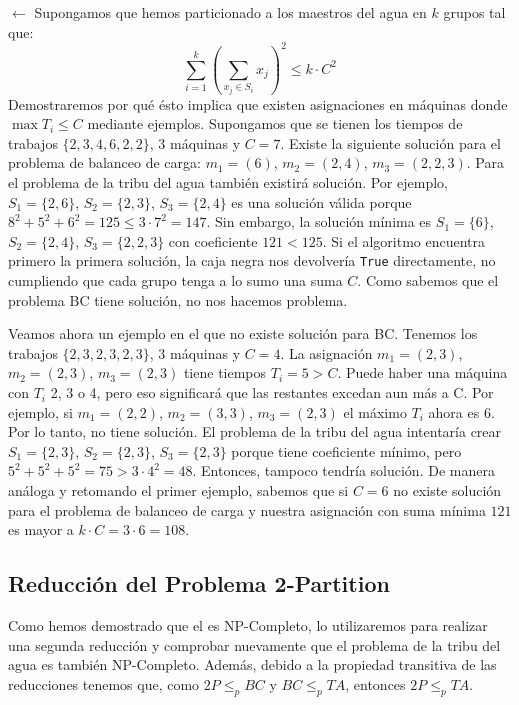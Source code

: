\documentclass{article}
\begin{document}
$\leftarrow$ Supongamos que hemos particionado a los maestros del agua en \( k \) grupos tal que:
\[
\sum_{i=1}^{k} \left( \sum_{x_j \in S_i} x_j \right)^2 \leq k \cdot C^2
\]
Demostraremos por qué ésto implica que existen asignaciones en máquinas donde $\max T_i \leq C$ mediante ejemplos. Supongamos que se tienen los tiempos de trabajos $\{2, 3, 4, 6, 2, 2\}$, 3 máquinas y $C = 7$. Existe la siguiente solución para el problema de balanceo de carga: $m_1 = (6)$, $m_2 = (2, 4)$, $m_3 = (2, 2, 3)$. Para el problema de la tribu del agua también existirá solución. Por ejemplo, $S_1 = \{2, 6\}$, $S_2 = \{2, 3\}$, $S_3 = \{2, 4\}$ es una solución válida porque $8^2 + 5^2 + 6^2 = 125 \leq 3 \cdot 7^2 = 147$. Sin embargo, la solución mínima es $S_1 = \{6\}$, $S_2 = \{2, 4\}$, $S_3 = \{2, 2, 3\}$ con coeficiente $121 < 125$.  Si el algoritmo encuentra primero la primera solución, la caja negra nos devolvería \texttt{True} directamente, no cumpliendo que cada grupo tenga a lo sumo una suma $C$. Como sabemos que el problema BC tiene solución, no nos hacemos problema. 

Veamos ahora un ejemplo en el que no existe solución para BC. Tenemos los trabajos $\{2, 3, 2, 3, 2, 3\}$, 3 máquinas y $C = 4$. La asignación $m_1 = (2, 3)$, $m_2 = (2, 3)$, $m_3 = (2, 3)$ tiene tiempos $T_i = 5 > C$. Puede haber una máquina con $T_i$ 2, 3 o 4, pero eso significará que las restantes excedan aun más a C. Por ejemplo, si $m_1 = (2, 2)$, $m_2 = (3, 3)$, $m_3 = (2, 3)$ el máximo $T_i$ ahora es 6. Por lo tanto, no tiene solución. El problema de la tribu del agua intentaría crear $S_1 = \{2, 3\}$, $S_2 = \{2, 3\}$, $S_3 = \{2, 3\}$ porque tiene coeficiente mínimo, pero $5^2 + 5^2 + 5^2 = 75 > 3 \cdot 4^2 = 48$. Entonces, tampoco tendría solución. De manera análoga y retomando el primer ejemplo, sabemos que si $C=6$ no existe solución para el problema de balanceo de carga y nuestra asignación con suma mínima $121$ es mayor a $k \cdot C = 3 \cdot 6 = 108$.

\subsection{Reducción del Problema 2-Partition}
Como hemos demostrado que el  es NP-Completo, lo utilizaremos para realizar una segunda reducción y comprobar nuevamente que el problema de la tribu del agua es también NP-Completo. Además, debido a la propiedad transitiva de las reducciones tenemos que, como $2P \leq_p BC$ y $BC \leq_p TA$, entonces $2P \leq_p TA$.
\end{document}
